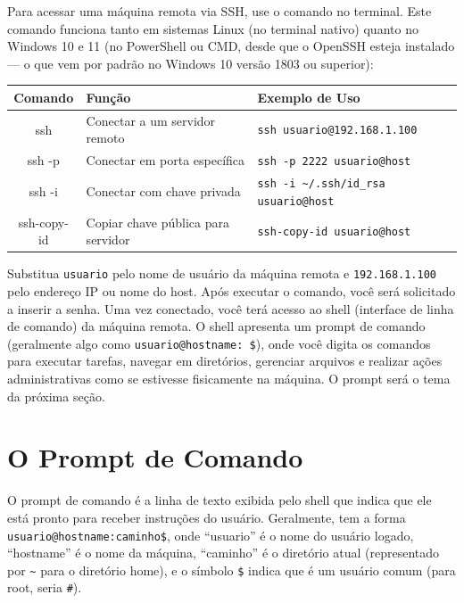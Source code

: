 \documentclass[12pt]{article}
\begin{document}
Para acessar uma máquina remota via SSH, use o comando no terminal. Este comando funciona tanto em sistemas Linux (no terminal nativo) quanto no Windows 10 e 11 (no PowerShell ou CMD, desde que o OpenSSH esteja instalado — o que vem por padrão no Windows 10 versão 1803 ou superior):

\begin{cmdbox}
\begin{tabularx}{\linewidth}{@{}C >{\raggedright\arraybackslash}X >{\raggedright\arraybackslash}X@{}}
\toprule
\textbf{Comando} & \textbf{Função} & \textbf{Exemplo de Uso} \\
\midrule
ssh & Conectar a um servidor remoto & \texttt{ssh usuario@192.168.1.100} \\
ssh -p & Conectar em porta específica & \texttt{ssh -p 2222 usuario@host} \\
ssh -i & Conectar com chave privada & \texttt{ssh -i \~{}/.ssh/id\_rsa usuario@host} \\
ssh-copy-id & Copiar chave pública para servidor & \texttt{ssh-copy-id usuario@host} \\
\bottomrule
\end{tabularx}
\end{cmdbox}

Substitua \texttt{usuario} pelo nome de usuário da máquina remota e \texttt{192.168.1.100} pelo endereço IP ou nome do host. Após executar o comando, você será solicitado a inserir a senha. Uma vez conectado, você terá acesso ao shell (interface de linha de comando) da máquina remota. O shell apresenta um prompt de comando (geralmente algo como \texttt{usuario@hostname:~\$}), onde você digita os comandos para executar tarefas, navegar em diretórios, gerenciar arquivos e realizar ações administrativas como se estivesse fisicamente na máquina. O prompt será o tema da próxima seção.

\section{O Prompt de Comando}

O prompt de comando é a linha de texto exibida pelo shell que indica que ele está pronto para receber instruções do usuário. Geralmente, tem a forma \texttt{usuario@hostname:caminho\$}, onde ``usuario'' é o nome do usuário logado, ``hostname'' é o nome da máquina, ``caminho'' é o diretório atual (representado por \texttt{\~} para o diretório home), e o símbolo \texttt{\$} indica que é um usuário comum (para root, seria \texttt{\#}).
\end{document}
